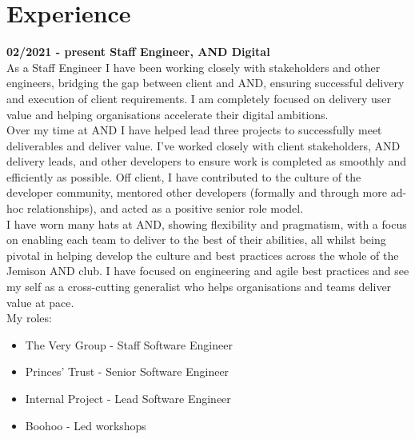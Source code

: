 \section{Experience}

\textbf{02/2021 - present \hspace{2.75em}Staff Engineer, AND Digital}\\

As a Staff Engineer I have been working closely with stakeholders and other engineers, bridging the gap between client and AND, ensuring successful delivery and execution of client requirements. I am completely focused on delivery user value and helping organisations accelerate their digital ambitions.\\

Over my time at AND I have helped lead three projects to successfully meet deliverables and deliver value. I’ve worked closely with client stakeholders, AND delivery leads, and other developers to ensure work is completed as smoothly and efficiently as possible. Off client, I have contributed to the culture of the developer community, mentored other developers (formally and through more ad-hoc relationships), and acted as a positive senior role model.\\

I have worn many hats at AND, showing flexibility and pragmatism, with a focus on enabling each team to deliver to the best of their abilities, all whilst being pivotal in helping develop the culture and best practices across the whole of the Jemison AND club. I have focused on engineering and agile best practices and see my self as a cross-cutting generalist who helps organisations and teams deliver value at pace.\\

My roles:\\

\begin{itemize}
  \item The Very Group   - Staff Software Engineer
  \item Princes' Trust   - Senior Software Engineer
  \item Internal Project - Lead Software Engineer
  \item Boohoo           - Led workshops
\end{itemize}

\bigskip

